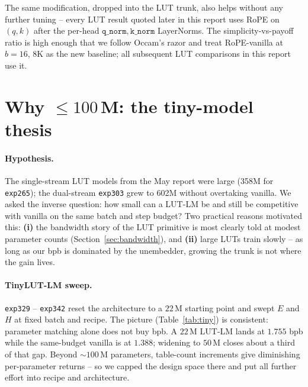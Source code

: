 \documentclass[11pt]{article}
\begin{document}
The same modification, dropped into the LUT trunk, also helps without any further tuning -- every LUT result quoted later in this report uses RoPE on $(q, k)$ after the per-head $\mathtt{q\_norm}, \mathtt{k\_norm}$ LayerNorms.
The simplicity-vs-payoff ratio is high enough that we follow Occam's razor and treat RoPE-vanilla at $b{=}16$, 8K as the new baseline; all subsequent LUT comparisons in this report use it.

\section{Why $\le 100$\,M: the tiny-model thesis}
\label{sec:tiny}

\paragraph{Hypothesis.}
The single-stream LUT models from the May report were large (358M for \texttt{exp265}); the dual-stream \texttt{exp303} grew to 602M without overtaking vanilla.
We asked the inverse question: how small can a LUT-LM be and still be competitive with vanilla on the same batch and step budget?
Two practical reasons motivated this:
\textbf{(i)} the bandwidth story of the LUT primitive is most clearly told at modest parameter counts (Section~\ref{sec:bandwidth}), and
\textbf{(ii)} large LUTs train slowly -- as long as our bpb is dominated by the unembedder, growing the trunk is not where the gain lives.

\paragraph{TinyLUT-LM sweep.}
\texttt{exp329} -- \texttt{exp342} reset the architecture to a $22$\,M starting point and swept $E$ and $H$ at fixed batch and recipe.
The picture (Table~\ref{tab:tiny}) is consistent: parameter matching alone does not buy bpb.
A $22$\,M LUT-LM lands at $1.755$ bpb while the same-budget vanilla is at $1.388$; widening to $50$\,M closes about a third of that gap.
Beyond $\sim 100$\,M parameters, table-count increments give diminishing per-parameter returns -- so we capped the design space there and put all further effort into recipe and architecture.
\end{document}
